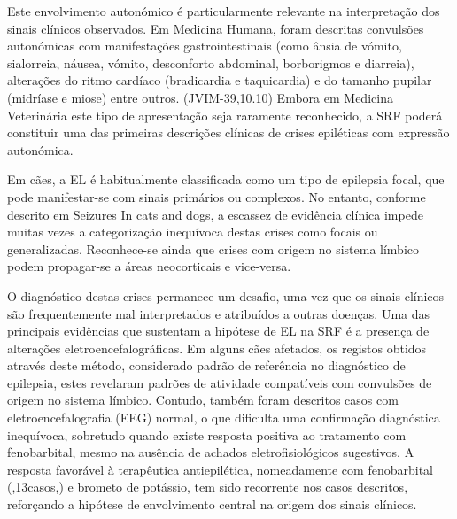 Este envolvimento autonómico é particularmente relevante na interpretação dos sinais clínicos observados. Em Medicina Humana, foram descritas convulsões autonómicas com manifestações gastrointestinais (como ânsia de vómito, sialorreia, náusea, vómito, desconforto abdominal, borborigmos e diarreia), alterações do ritmo cardíaco (bradicardia e taquicardia) e do tamanho pupilar (midríase e miose) entre outros. (JVIM-39,10.10) Embora em Medicina Veterinária este tipo de apresentação seja raramente reconhecido, a SRF poderá constituir uma das primeiras descrições clínicas de crises epiléticas com expressão autonómica. \cite{Diop2025}


Em cães, a EL é habitualmente classificada como um tipo de epilepsia focal, que pode manifestar-se com sinais primários ou complexos. No entanto, conforme descrito em Seizures In cats and dogs, a escassez de evidência clínica impede muitas vezes a categorização inequívoca destas crises como focais ou generalizadas. Reconhece-se ainda que crises com origem no sistema límbico podem propagar-se a áreas neocorticais e vice-versa. 


O diagnóstico destas crises permanece um desafio, uma vez que os sinais clínicos são frequentemente mal interpretados e atribuídos a outras doenças. \cite{Diop2025}
Uma das principais evidências que sustentam a hipótese de EL na SRF é a presença de alterações eletroencefalográficas. Em alguns cães afetados, os registos obtidos através deste método, considerado padrão de referência no diagnóstico de epilepsia, estes revelaram padrões de atividade compatíveis com convulsões de origem no sistema límbico. \cite{gibbon_phenobarbital-responsive_german_2004} Contudo, também foram descritos casos com eletroencefalografia (EEG) normal, \cite{gibbon_phenobarbital-responsive_german_2004} o que dificulta uma confirmação diagnóstica inequívoca, sobretudo quando existe resposta positiva ao tratamento com fenobarbital, mesmo na ausência de achados eletrofisiológicos sugestivos.
A resposta favorável à terapêutica antiepilética, nomeadamente com fenobarbital (\cite{Alcoverro2014},13casos,\cite{gibbon_phenobarbital-responsive_german_2004}) e brometo de potássio, \cite{Alcoverro2014} tem sido recorrente nos casos descritos, reforçando a hipótese de envolvimento central na origem dos sinais clínicos.


